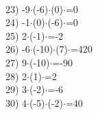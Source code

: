 \documentclass[a4paper,10pt]{article}
\begin{document}
\vspace{0.5cm}\\23)   -9$\cdot$(-6)$\cdot$(0)$\cdot$=0
\vspace{0.5cm}\\24)   -1$\cdot$(0)$\cdot$(-6)$\cdot$=0
\vspace{0.5cm}\\25)   2$\cdot$(-1)$\cdot$=-2
\vspace{0.5cm}\\26)   -6$\cdot$(-10)$\cdot$(7)$\cdot$=420
\vspace{0.5cm}\\27)   9$\cdot$(-10)$\cdot$=-90
\vspace{0.5cm}\\28)   2$\cdot$(1)$\cdot$=2
\vspace{0.5cm}\\29)   3$\cdot$(-2)$\cdot$=-6
\vspace{0.5cm}\\30)   4$\cdot$(-5)$\cdot$(-2)$\cdot$=40
\vspace{0.5cm}\\\pagebreak
\end{document}
